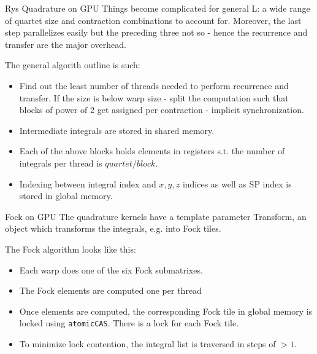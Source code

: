 \documentclass{beamer}
\begin{document}
\begin{frame}{Rys Quadrature on GPU}
  Things become complicated for general L:  a wide range of quartet
  size and contraction combinations to account for. Moreover, the last
  step parallelizes easily but the preceding three not so - hence the
  recurrence and transfer are the major overhead.

  The general algorith outline is such:
  
\begin{itemize}
  \item Find out the least number of threads needed to perform
    recurrence and transfer.  If the size is below warp size - split
    the computation such that blocks of power of 2 get assigned per
    contraction - implicit synchronization.
  \item Intermediate integrals are stored in shared memory.
  \item Each of the above blocks holds elements in registers s.t.
    the number of integrals per thread is $quartet/block$.
  \item Indexing between integral index and $x,y,z$ indices as well as
    SP index is stored in global memory.
\end{itemize}

\end{frame}

\begin{frame}{ Fock on GPU}
The quadrature kernels have a template parameter Transform, an object
which transforms the integrals, e.g. into Fock tiles.

The Fock algorithm looks like this:
\begin{itemize}
\item Each warp does one of the six Fock submatrixes.
\item The Fock elements are computed one per thread
\item Once elements are computed, the corresponding Fock tile  in
  global memory is locked using {\tt atomicCAS}.  There is a lock for
  each Fock tile.
\item To minimize lock contention, the integral list is traversed in
  steps of $> 1$.
\end{itemize}
\end{frame}
\end{document}
